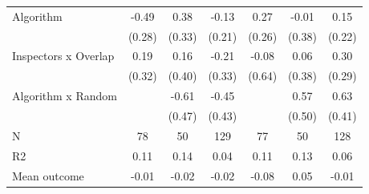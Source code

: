 \begin{tabular}{lccc|ccc}
Algorithm   &       -0.49\sym{*}  &        0.38         &       -0.13         &        0.27         &       -0.01         &        0.15         \\
            &      (0.28)         &      (0.33)         &      (0.21)         &      (0.26)         &      (0.38)         &      (0.22)         \\
\addlinespace
Inspectors x Overlap&        0.19         &        0.16         &       -0.21         &       -0.08         &        0.06         &        0.30         \\
            &      (0.32)         &      (0.40)         &      (0.33)         &      (0.64)         &      (0.38)         &      (0.29)         \\
\addlinespace
Algorithm x Random&                     &       -0.61         &       -0.45         &                     &        0.57         &        0.63         \\
            &                     &      (0.47)         &      (0.43)         &                     &      (0.50)         &      (0.41)         \\
\midrule
N           &          78         &          50         &         129         &          77         &          50         &         128         \\
R2          &        0.11         &        0.14         &        0.04         &        0.11         &        0.13         &        0.06         \\
Mean outcome&       -0.01         &       -0.02         &       -0.02         &       -0.08         &        0.05         &       -0.01         \\
\bottomrule \end{tabular}
